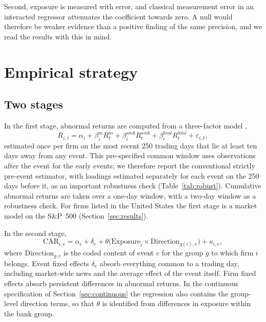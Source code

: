 \documentclass[11pt]{article}
\theoremstyle{plain}\newtheorem{proposition}{Proposition}
\begin{document}
Second, exposure is measured with error, and classical measurement error in an interacted regressor attenuates the coefficient towards zero. A null would therefore be weaker evidence than a positive finding of the same precision, and we read the results with this in mind.

\section{Empirical strategy}\label{sec:strategy}

\subsection{Two stages}

In the first stage, abnormal returns are computed from a three-factor model \citep{fama1993},
\begin{equation}\label{eq:stage1}
R_{i,t} = \alpha_i + \beta_i^{m} R^{m}_t + \beta_i^{smb} R^{smb}_t + \beta_i^{hml} R^{hml}_t + \varepsilon_{i,t},
\end{equation}
estimated once per firm on the most recent 250 trading days that lie at least ten days away from any event. This pre-specified common window uses observations after the event for the early events; we therefore report the conventional strictly pre-event estimator, with loadings estimated separately for each event on the 250 days before it, as an important robustness check (Table~\ref{tab:robust}). Cumulative abnormal returns are taken over a one-day window, with a two-day window as a robustness check. For firms listed in the United States the first stage is a market model on the S\&P~500 (Section~\ref{sec:results}).

In the second stage,
\begin{equation}\label{eq:stage2}
\mathrm{CAR}_{i,e} = \alpha_i + \delta_e + \theta \bigl(\mathrm{Exposure}_i \times \mathrm{Direction}_{g(i),e}\bigr) + u_{i,e},
\end{equation}
where $\mathrm{Direction}_{g,e}$ is the coded content of event $e$ for the group $g$ to which firm $i$ belongs. Event fixed effects $\delta_e$ absorb everything common to a trading day, including market-wide news and the average effect of the event itself. Firm fixed effects absorb persistent differences in abnormal returns. In the continuous specification of Section~\ref{sec:continuous} the regression also contains the group-level direction terms, so that $\theta$ is identified from differences in exposure within the bank group.
\end{document}
